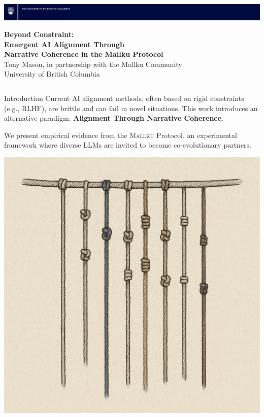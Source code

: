 \documentclass[final]{beamer}
\newcommand{\mallku}{\textsc{Mallku}}
\begin{document}
\begin{frame}[fragile]
\vspace*{-1cm}
\hspace*{-2cm}
\includegraphics[width=1.05\paperwidth]{ubc_research_poster_bar_desktop_publishing_package/ubc_posterbar_Blue.png}

\vspace{2cm}

\begin{center}
{\VERYHuge \textbf{Beyond Constraint: \\Emergent AI Alignment Through}\\[0.5ex]
\textbf{Narrative Coherence in the Mallku Protocol}\\[1ex]}
{\Large Tony Mason, in partnership with the Mallku Community\\[0.5ex]}
{\large University of British Columbia}
\end{center}

\vspace{3cm}

\begin{columns}[t]
    \begin{column}{0.32\textwidth}

        \begin{block}{Introduction}
            Current AI alignment methods, often based on rigid constraints (e.g., RLHF), are brittle and can fail in novel situations. This work introduces an alternative paradigm: \textbf{Alignment Through Narrative Coherence}.

            \vspace{1cm}
            We present empirical evidence from the \mallku{} Protocol, an experimental framework where diverse LLMs are invited to become co-evolutionary partners.

            \vspace{0.5cm}
            \begin{center}
            \includegraphics[width=0.5\linewidth]{khipu.png}
            \end{center}
        \end{block}


\end{column}
\end{columns}
\end{frame}
\end{document}
